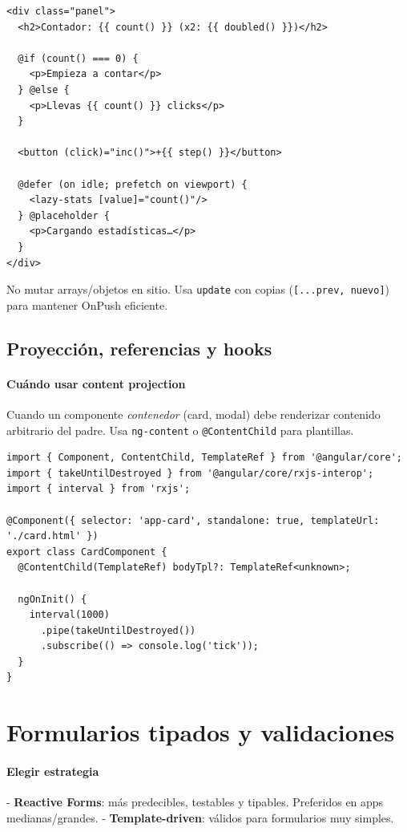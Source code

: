 \documentclass[11pt,a4paper]{article}
\begin{document}
\begin{lstlisting}[style=htmlstyle, caption={Plantilla moderna con @if/@for y @defer}]
<div class="panel">
  <h2>Contador: {{ count() }} (x2: {{ doubled() }})</h2>

  @if (count() === 0) {
    <p>Empieza a contar</p>
  } @else {
    <p>Llevas {{ count() }} clicks</p>
  }

  <button (click)="inc()">+{{ step() }}</button>

  @defer (on idle; prefetch on viewport) {
    <lazy-stats [value]="count()"/>
  } @placeholder {
    <p>Cargando estadísticas…</p>
  }
</div>
\end{lstlisting}

\begin{warnbox}
No mutar arrays/objetos en sitio. Usa \texttt{update} con copias (\texttt{[...prev, nuevo]}) para mantener OnPush eficiente.
\end{warnbox}

\subsection{Proyección, referencias y hooks}
\paragraph{Cuándo usar content projection}
Cuando un componente \emph{contenedor} (card, modal) debe renderizar contenido arbitrario del padre. Usa \texttt{ng-content} o \texttt{@ContentChild} para plantillas.

\begin{lstlisting}[style=tsstyle, caption={Content projection y limpieza reactiva}]
import { Component, ContentChild, TemplateRef } from '@angular/core';
import { takeUntilDestroyed } from '@angular/core/rxjs-interop';
import { interval } from 'rxjs';

@Component({ selector: 'app-card', standalone: true, templateUrl: './card.html' })
export class CardComponent {
  @ContentChild(TemplateRef) bodyTpl?: TemplateRef<unknown>;

  ngOnInit() {
    interval(1000)
      .pipe(takeUntilDestroyed())
      .subscribe(() => console.log('tick'));
  }
}
\end{lstlisting}

\section{Formularios tipados y validaciones}
\paragraph{Elegir estrategia}
- \textbf{Reactive Forms}: más predecibles, testables y tipables. Preferidos en apps medianas/grandes.
- \textbf{Template-driven}: válidos para formularios muy simples.
\end{document}
